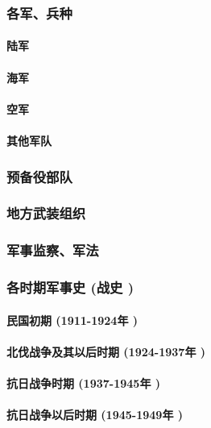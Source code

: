 \documentclass[UTF8]{../ApplicationUniverse}
\begin{document}
        \subsubsection{各军、兵种}
            \paragraph{陆军}
            \paragraph{海军}
            \paragraph{空军}
            \paragraph{其他军队}
        \subsubsection{预备役部队}
        \subsubsection{地方武装组织}
        \subsubsection{军事监察、军法}
        \subsubsection{各时期军事史 (战史 )}
            \paragraph{民国初期 (1911-1924年 )}
            \paragraph{北伐战争及其以后时期 (1924-1937年 )}
            \paragraph{抗日战争时期 (1937-1945年 )}
            \paragraph{抗日战争以后时期 (1945-1949年 )}
\end{document}
